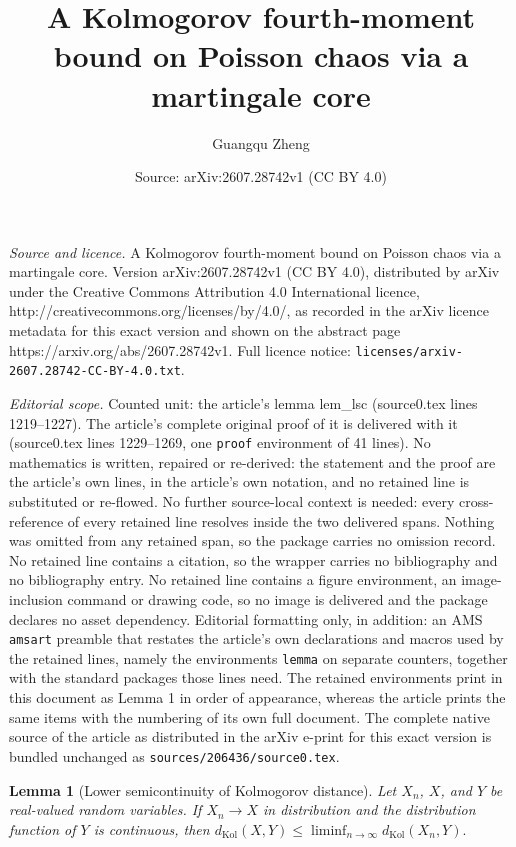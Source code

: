 \documentclass[10pt,a4paper]{amsart}
\title{A Kolmogorov fourth-moment bound on Poisson chaos via a martingale core}
\author{Guangqu Zheng}
\date{Source: arXiv:2607.28742v1 (CC BY 4.0)}
\newtheorem{lemma}{Lemma}
\newcommand{\dK}{d_{\mathrm{Kol}}}
\begin{document}
\maketitle

\noindent\emph{Source and licence.} A Kolmogorov fourth-moment bound on Poisson chaos via a martingale core. Version arXiv:2607.28742v1 (CC BY 4.0), distributed by arXiv under the Creative Commons Attribution 4.0 International licence, http://creativecommons.org/licenses/by/4.0/, as recorded in the arXiv licence metadata for this exact version and shown on the abstract page https://arxiv.org/abs/2607.28742v1. Full licence notice: \texttt{licenses/arxiv-2607.28742-CC-BY-4.0.txt}.\par\smallskip

\noindent\textit{Editorial scope.} Counted unit: the article's lemma lem\_lsc (source0.tex lines 1219--1227). The article's complete original proof of it is delivered with it (source0.tex lines 1229--1269, one \texttt{proof} environment of 41 lines). No mathematics is written, repaired or re-derived: the statement and the proof are the article's own lines, in the article's own notation, and no retained line is substituted or re-flowed.  No further source-local context is needed: every cross-reference of every retained line resolves inside the two delivered spans.  Nothing was omitted from any retained span, so the package carries no omission record.  No retained line contains a citation, so the wrapper carries no bibliography and no bibliography entry.  No retained line contains a figure environment, an image-inclusion command or drawing code, so no image is delivered and the package declares no asset dependency.  Editorial formatting only, in addition: an AMS \texttt{amsart} preamble that restates the article's own declarations and macros used by the retained lines, namely the environments \texttt{lemma} on separate counters, together with the standard packages those lines need.  The retained environments print in this document as Lemma 1 in order of appearance, whereas the article prints the same items with the numbering of its own full document.  The complete native source of the article as distributed in the arXiv e-print for this exact version is bundled unchanged as \texttt{sources/206436/source0.tex}.
\begin{lemma}[\textsf{Lower semicontinuity of Kolmogorov distance}]
\label{lem_lsc}
Let $X_n$, $X$, and $Y$ be real-valued random variables.  If
$X_n\to X$ in distribution and the distribution function of $Y$ is
continuous, then
$\dK(X,Y)
  \leq\liminf_{n\to\infty}\dK(X_n,Y).
$
\end{lemma}
\end{document}
